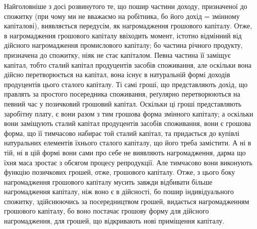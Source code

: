 Найголовніше з досі розвинутого те, що пошир частини доходу, призначеної
до спожитку (при чому ми не вважаємо на робітника, бо його дохід = змінному
капіталові), виявляється передусім, як нагромадження грошового капіталу.
Отже, в нагромадження грошового капіталу ввіходить момент, істотно відмінний
від дійсного нагромадження промислового капіталу; бо частина річного
продукту, призначена до спожитку, ніяк не стає капіталом. Певна частина її
заміщує капітал, тобто сталий капітал продуцентів засобів споживання, але
оскільки вона дійсно перетворюється на капітал, вона існує в натуральній формі
доходів продуцентів цього сталого капіталу. Ті самі гроші, що представляють
дохід, що правлять за простого посередника споживання, реґулярно перетворюються
на певний час у позичковий грошовий капітал. Оскільки ці гроші
представляють заробітну плату, є вони разом з тим грошова форма змінного
капіталу; а оскільки вони заміщують сталий капітал продуцентів засобів споживання,
вони є грошова форма, що її тимчасово набирає той сталий капітал,
та придається до купівлі натуральних елементів їхнього сталого капіталу, що його
треба замістити. А ні в тій, ні в цій формі вони сами про себе не виявляють
нагромадження, дарма що їхня маса зростає з обсягом процесу репродукції.
Але тимчасово вони виконують функцію позичкових грошей, отже, грошового
капіталу. Отже, з цього боку нагромадження грошового капіталу мусить
завжди відбивати більше нагромадження капіталу, ніж воно є в дійсності, бо
пошир індивідуального спожитку, здійснюючись за посередництвом грошей, видається
нагромадженням грошового капіталу, бо воно постачає грошову форму для
дійсного нагромадження, для грошей, що відкривають нові приміщення капіталу.

